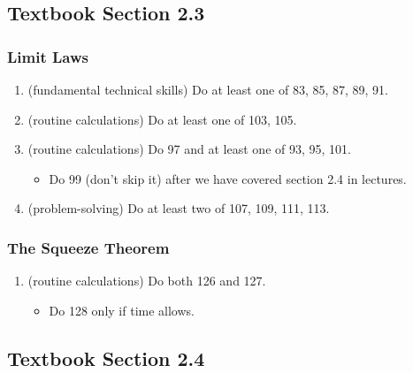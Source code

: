 \documentclass[./main.tex]{subfiles}
\begin{document}
\subsection*{Textbook Section 2.3} 

\subsubsection*{Limit Laws}
\begin{enumerate}
  \item (fundamental technical skills) Do at least one of 83, 85, 87, 89, 91.
  \item (routine calculations) Do at least one of 103, 105.
  \item (routine calculations) Do 97 and at least one of 93, 95, 101.
    \begin{itemize}
      \item Do 99 (don't skip it) after we have covered section 2.4 in lectures.
    \end{itemize}
  \item (problem-solving) Do at least two of 107, 109, 111, 113. 
\end{enumerate}

\subsubsection{The Squeeze Theorem}
\begin{enumerate}
  \item (routine calculations) Do both 126 and 127.
    \begin{itemize}
      \item Do 128 only if time allows. 
    \end{itemize}
\end{enumerate}

\subsection*{Textbook Section 2.4}
\end{document}
